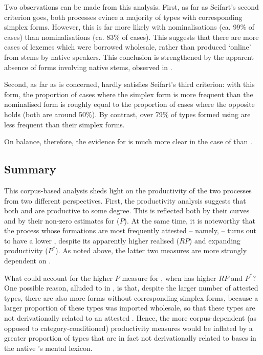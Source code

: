 \documentclass[output=paper]{LSP/langsci}
\begin{document}
Two observations can be made from this analysis. First, as far as Seifart's second criterion goes, both  processes evince a majority of types with corresponding simplex forms. However, this is far more likely with {\ar} nominalisations (ca. 99\% of cases) than {\zjoni} nominalisations (ca. 83\% of cases). This suggests that there are more cases of {\zjoni} lexemes which were borrowed wholesale, rather than produced `online' from stems by native speakers. This conclusion is strengthened by the apparent absence of {\zjoni} forms involving native  stems, observed in .

Second, as far as  is concerned, {\zjoni} hardly satisfies Seifart's third criterion: with this form, the proportion of cases where the simplex form is more frequent than the nominalised form is roughly equal to the proportion of cases where the opposite holds (both are around 50\%). By contrast, over 79\% of types formed using {\ar} are less frequent than their simplex forms. 

On balance, therefore, the evidence for  is much more clear in the case of {\ar} than {\zjoni} .

\subsection{Summary}
This corpus-based analysis sheds light on the productivity of the two  processes from two different perspectives. First, the productivity analysis suggests that both {\ar} and {\zjoni} are productive to some degree. This is reflected both by their  curves and by their non-zero estimates for  ($P$). At the same time, it is noteworthy that the process whose formations are most frequently attested -- namely, {\zjoni} -- turns out to have a lower , despite its apparently higher realised ($RP$) and expanding productivity ($P^{*}$). As noted above, the latter two measures are more strongly dependent on  \citep{Baayen2009}. 

What could account for the higher $P$ measure for \ar, when {\zjoni} has higher $RP$ and $P^{*}$? One possible reason, alluded to in , is that, despite the larger number of attested {\zjoni} types, there are also more forms without corresponding simplex forms, because a larger proportion of these types was imported wholesale, so that these types are not derivationally related to an attested . Hence, the more corpus-dependent (as opposed to category-conditioned) productivity measures would be inflated by a greater proportion of types that are in fact not derivationally related to bases in the native 's mental lexicon. 
\end{document}
